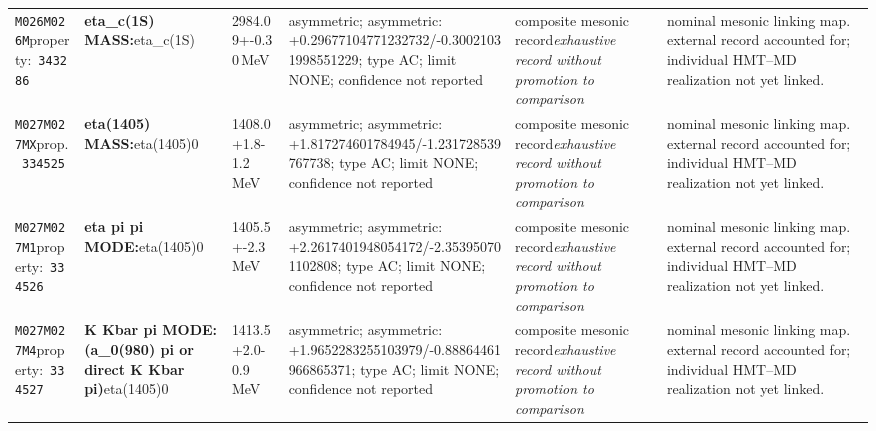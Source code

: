\begin{landscape}
\begin{longtable}{L{1.85cm}L{4.45cm}L{2.35cm}L{4.05cm}L{3.35cm}L{7.15cm}}
\texttt{M026}\newline \texttt{M026M}\newline property:\ \texttt{343286} & \textbf{eta\_\allowbreak{}c(1S) MASS:}\newline eta\_\allowbreak{}c(1S) & 2984.09+-0.30\,MeV & asymmetric; asymmetric: +0.29677104771232732/-0.30021031998551229; type AC; limit NONE; confidence not reported & composite mesonic record\newline \emph{exhaustive record without promotion to comparison} & nominal mesonic linking map. external record accounted for; individual HMT--MD realization not yet linked. \\
\texttt{M027}\newline \texttt{M027MX}\newline prop.\ \texttt{334525} & \textbf{eta(1405) MASS:}\newline eta(1405)0 & 1408.0+1.8-1.2\,MeV & asymmetric; asymmetric: +1.817274601784945/-1.231728539767738; type AC; limit NONE; confidence not reported & composite mesonic record\newline \emph{exhaustive record without promotion to comparison} & nominal mesonic linking map. external record accounted for; individual HMT--MD realization not yet linked. \\
\texttt{M027}\newline \texttt{M027M1}\newline property:\ \texttt{334526} & \textbf{eta pi pi MODE:}\newline eta(1405)0 & 1405.5+-2.3\,MeV & asymmetric; asymmetric: +2.2617401948054172/-2.353950701102808; type AC; limit NONE; confidence not reported & composite mesonic record\newline \emph{exhaustive record without promotion to comparison} & nominal mesonic linking map. external record accounted for; individual HMT--MD realization not yet linked. \\
\texttt{M027}\newline \texttt{M027M4}\newline property:\ \texttt{334527} & \textbf{K Kbar pi MODE: (a\_\allowbreak{}0(980) pi or direct K Kbar pi)}\newline eta(1405)0 & 1413.5+2.0-0.9\,MeV & asymmetric; asymmetric: +1.9652283255103979/-0.88864461966865371; type AC; limit NONE; confidence not reported & composite mesonic record\newline \emph{exhaustive record without promotion to comparison} & nominal mesonic linking map. external record accounted for; individual HMT--MD realization not yet linked. \\

\end{longtable}
\end{landscape}
